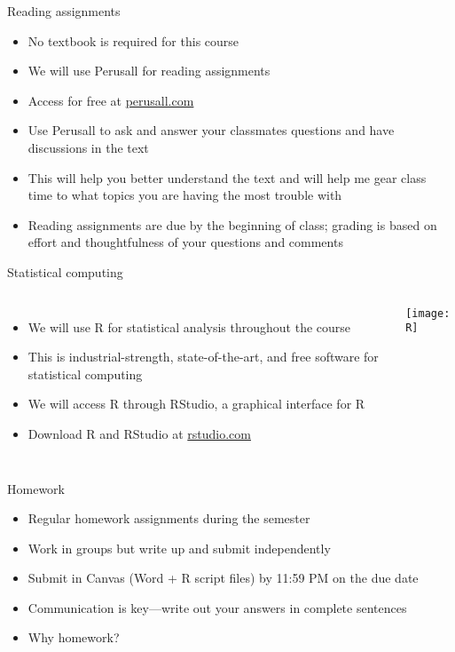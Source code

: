 \documentclass{beamer}\usepackage[]{graphicx}\usepackage[]{color}
\begin{document}
\begin{darkframes}
    \begin{frame}{Reading assignments}
      \begin{itemize}
        \item No textbook is required for this course
        \item We will use \alert{Perusall} for reading assignments
        \item Access for free at \url{perusall.com}
        \item Use Perusall to ask and answer your classmates questions and have discussions in the text
        \item This will help you better understand the text and will help me gear class time to what topics you are having the most trouble with
        \item Reading assignments are due by the beginning of class; grading is based on effort and thoughtfulness of your questions and comments
      \end{itemize}
    \end{frame}

    \begin{frame}{Statistical computing}
      \begin{columns}[onlytextwidth]
          \begin{itemize}
            \item We will use \alert{R} for statistical analysis throughout the course
            \item This is industrial-strength, state-of-the-art, and free software for statistical computing
            \item We will access R through \alert{RStudio}, a graphical interface for R
            \item Download R and RStudio at \url{rstudio.com}
          \end{itemize}
          \texttt{[image: R]}
      \end{columns}
    \end{frame}

    \begin{frame}{Homework}
      \begin{itemize}
        \item Regular homework assignments during the semester
        \item Work in groups but write up and submit independently
        \item Submit in Canvas (Word + R script files) by 11:59 PM on the due date
        \item Communication is key---write out your answers in complete sentences
        \item Why homework?
      \end{itemize}
    \end{frame}


\end{darkframes}
\end{document}

